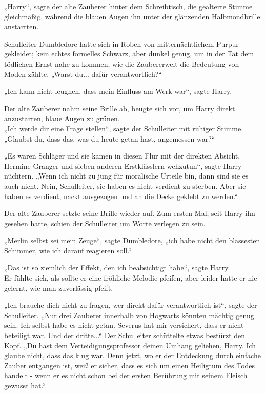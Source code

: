 {„Harry“, sagte der alte Zauberer hinter dem Schreibtisch, die gealterte Stimme gleichmäßig, während die blauen Augen ihn unter der glänzenden Halbmondbrille anstarrten.

Schulleiter Dumbledore hatte sich in Roben von mitternächtlichem Purpur gekleidet; kein echtes formelles Schwarz, aber dunkel genug, um in der Tat dem tödlichen Ernst nahe zu kommen, wie die Zaubererwelt die Bedeutung von Moden zählte. „Warst du... dafür verantwortlich?“

„Ich kann nicht leugnen, dass mein Einfluss am Werk war“, sagte Harry.

Der alte Zauberer nahm seine Brille ab, beugte sich vor, um Harry direkt anzustarren, blaue Augen zu grünen.\\ „Ich werde dir eine Frage stellen“, sagte der Schulleiter mit ruhiger Stimme. „Glaubst du, dass das, was du heute getan hast, angemessen war?“

„Es waren Schläger und sie kamen in diesen Flur mit der direkten Absicht, Hermine Granger und sieben anderen Erstklässlern wehzutun“, sagte Harry nüchtern. „Wenn ich nicht zu jung für moralische Urteile bin, dann sind sie es auch nicht. Nein, Schulleiter, sie haben es nicht verdient zu sterben. Aber sie haben es verdient, nackt ausgezogen und an die Decke geklebt zu werden.“

Der alte Zauberer setzte seine Brille wieder auf. Zum ersten Mal, seit Harry ihn gesehen hatte, schien der Schulleiter um Worte verlegen zu sein.

„Merlin selbst sei mein Zeuge“, sagte Dumbledore, „ich habe nicht den blassesten Schimmer, wie ich darauf reagieren soll.“

„Das ist so ziemlich der Effekt, den ich beabsichtigt habe“, sagte Harry.\\ Er fühlte sich, als sollte er eine fröhliche Melodie pfeifen, aber leider hatte er nie gelernt, wie man zuverlässig pfeift.

„Ich brauche dich nicht zu fragen, wer direkt dafür verantwortlich ist“, sagte der Schulleiter. „Nur drei Zauberer innerhalb von Hogwarts könnten mächtig genug sein. Ich selbst habe es nicht getan. Severus hat mir versichert, dass er nicht beteiligt war. Und der dritte...“ Der Schulleiter schüttelte etwas bestürzt den Kopf. „Du hast dem Verteidigungsprofessor deinen Umhang geliehen, Harry. Ich glaube nicht, dass das klug war. Denn jetzt, wo er der Entdeckung durch einfache Zauber entgangen ist, weiß er sicher, dass es sich um einen Heiligtum des Todes handelt - wenn er es nicht schon bei der ersten Berührung mit seinem Fleisch gewusst hat.“

}
